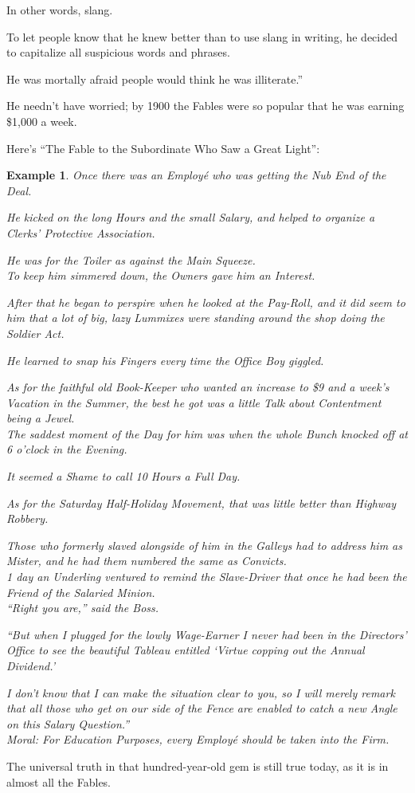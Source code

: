 \documentclass{book}
\numberwithin{equation}{section}
\newtheorem{example}{Example}[chapter]
\begin{document}
In other words, slang.

To let people know that he knew better than to use slang in writing, he decided to capitalize all suspicious words and phrases.

He was mortally afraid people would think he was illiterate.''

He needn't have worried; by 1900 the Fables were so popular that he was earning \$1,000 a week.

Here's ``The Fable to the Subordinate Who Saw a Great Light'':
\begin{example}
    Once there was an Employ\'e who was getting the Nub End of the Deal.
   
   He kicked on the long Hours and the small Salary, and helped to organize a Clerks' Protective Association.
   
   He was for the Toiler as against the Main Squeeze.
   \\
   
   To keep him simmered down, the Owners gave him an Interest.
   
   After that he began to perspire when he looked at the Pay-Roll, and it did seem to him that a lot of big, lazy Lummixes were standing around the shop doing the Soldier Act.
   
   He learned to snap his Fingers every time the Office Boy giggled.
   
   As for the faithful old Book-Keeper who wanted an increase to \$9 and a week's Vacation in the Summer, the best he got was a little Talk about Contentment being a Jewel.
   \\
   
   The saddest moment of the Day for him was when the whole Bunch knocked off at 6 o'clock in the Evening.
   
   It seemed a Shame to call 10 Hours a Full Day.
   
   As for the Saturday Half-Holiday Movement, that was little better than Highway Robbery.
   
   Those who formerly slaved alongside of him in the Galleys had to address him as Mister, and he had them numbered the same as Convicts.
   \\
   
   1 day an Underling ventured to remind the Slave-Driver that once he had been the Friend of the Salaried Minion.
   \\
   
   ``Right you are,'' said the Boss.
   
   ``But when I plugged for the lowly Wage-Earner I never had been in the Directors' Office to see the beautiful Tableau entitled `Virtue copping out the Annual Dividend.'
   
   I don't know that I can make the situation clear to you, so I will merely remark that all those who get on our side of the Fence are enabled to catch a new Angle on this Salary Question.''
   \\
   
   Moral: \emph{For Education Purposes, every Employ\'e should be taken into the Firm}.
\end{example}
The universal truth in that hundred-year-old gem is still true today, as it is in almost all the Fables.
\end{document}
